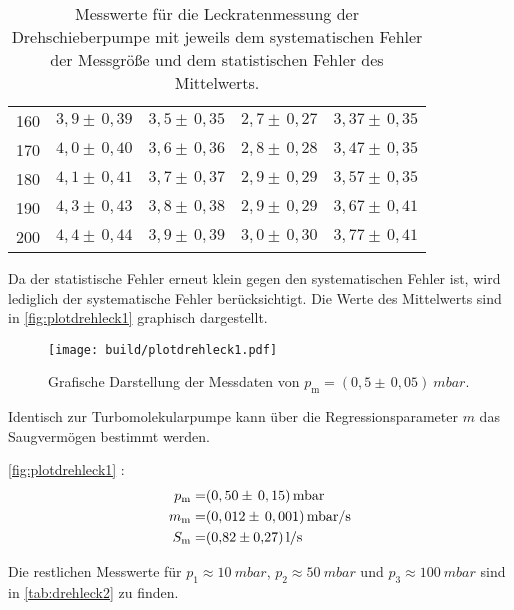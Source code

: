 \begin{table}[H]
\begin{tabular}{c|c|c|c|c}
  160   & $ 3,9  \pm \,  0,39 $ & $ 3,5  \pm \,  0,35 $ & $ 2,7  \pm \,  0,27 $ & $ 3,37  \pm \,  0,35 $ \\
  170   & $ 4,0  \pm \,  0,40 $ & $ 3,6  \pm \,  0,36 $ & $ 2,8  \pm \,  0,28 $ & $ 3,47  \pm \,  0,35 $ \\
  180   & $ 4,1  \pm \,  0,41 $ & $ 3,7  \pm \,  0,37 $ & $ 2,9  \pm \,  0,29 $ & $ 3,57  \pm \,  0,35 $ \\
  190   & $ 4,3  \pm \,  0,43 $ & $ 3,8  \pm \,  0,38 $ & $ 2,9  \pm \,  0,29 $ & $ 3,67  \pm \,  0,41 $ \\
  200   & $ 4,4  \pm \,  0,44 $ & $ 3,9  \pm \,  0,39 $ & $ 3,0  \pm \,  0,30 $ & $ 3,77  \pm \,  0,41 $ \\
  \end{tabular}
  \caption{Messwerte für die Leckratenmessung der Drehschieberpumpe mit jeweils dem systematischen Fehler der Messgröße und dem statistischen Fehler
           des Mittelwerts.}
  \label{tab:drehleck1}
\end{table}
\noindent
Da der statistische Fehler erneut klein gegen den systematischen Fehler ist, wird lediglich der systematische Fehler berücksichtigt.
Die Werte des Mittelwerts sind in \autoref{fig:plotdrehleck1} graphisch dargestellt.

\begin{figure}[H]
  \centering
  \texttt{[image: build/plotdrehleck1.pdf]}
  \caption{Grafische Darstellung der Messdaten von $p_{\text{m}}  = (0,5 \pm \, 0,05) \: \si{mbar}$.}
  \label{fig:plotdrehleck1}
\end{figure}
\noindent
Identisch zur Turbomolekularpumpe kann über die Regressionsparameter $m$ das Saugvermögen bestimmt werden.

\noindent
\autoref{fig:plotdrehleck1} :
	\begin{align*}
		p_{\text{m}} =& (0,50 \pm \, 0,15) \, \si{mbar}\\
		m_{\text{m}} =& (0,012 \pm \, 0,001) \, \si{mbar/s}\\
		S_{\text{m}} =& \SI{0,82 \pm 0,27}{l/s}
  \end{align*}

\noindent
Die restlichen Messwerte für $p_1 \approx 10 \: \si{mbar}$, $p_2 \approx 50 \: \si{mbar}$ und $p_3 \approx 100 \: \si{mbar}$ sind in
\autoref{tab:drehleck2} zu finden.


